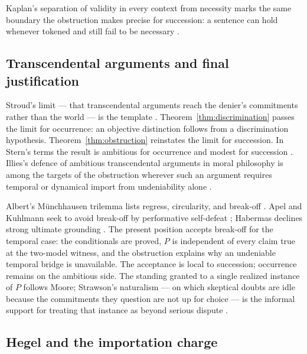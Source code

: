 \documentclass[11pt]{article}
\begin{document}
Kaplan's separation of validity in every context from necessity marks the same
boundary the obstruction makes precise for succession: a sentence can hold
whenever tokened and still fail to be necessary \cite{kaplan1989}.

\subsection{Transcendental arguments and final justification}

Stroud's limit --- that transcendental arguments reach the denier's commitments
rather than the world --- is the template \cite{stroud1968}.
Theorem~\ref{thm:discrimination} passes the limit for occurrence: an objective
distinction follows from a discrimination hypothesis.
Theorem~\ref{thm:obstruction} reinstates the limit for succession. In Stern's
terms the result is ambitious for occurrence and modest for succession
\cite{stern2000}. Illies's defence of ambitious transcendental arguments in
moral philosophy is among the targets of the obstruction wherever such an
argument requires temporal or dynamical import from undeniability alone
\cite{illies2003}.

Albert's Münchhausen trilemma lists regress, circularity, and break-off
\cite{albert1985}. Apel and Kuhlmann seek to avoid break-off by performative
self-defeat \cite{apel1980,kuhlmann1985}; Habermas declines strong ultimate
grounding \cite{habermas1990}. The present position accepts break-off for the
temporal case: the conditionals are proved, \(P\) is independent of every claim
true at the two-model witness, and the obstruction explains why an undeniable
temporal bridge is unavailable. The acceptance is local to succession;
occurrence remains on the ambitious side. The standing granted to a single
realized instance of \(P\) follows Moore; Strawson's naturalism --- on which
skeptical doubts are idle because the commitments they question are not up for
choice --- is the informal support for treating that instance as beyond serious
dispute \cite{moore1925,strawson1985}.

\subsection{Hegel and the importation charge}
\end{document}
